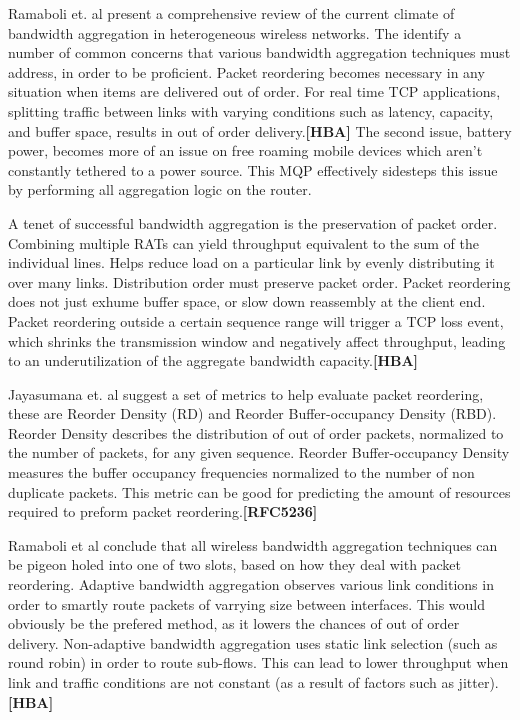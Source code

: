\documentclass[12pt]{article}
\newcommand{\lcite}[1]
{{\bfseries\color{orange}[#1]}}
\begin{document}
	Ramaboli et. al present a comprehensive review of the current climate of bandwidth aggregation in heterogeneous wireless networks. The identify a number of common concerns that various bandwidth aggregation techniques must address, in order to be proficient. Packet reordering becomes necessary in any situation when items are delivered out of order. For real time TCP applications, splitting traffic between links with varying conditions such as latency, capacity, and buffer space, results in out of order delivery.\lcite{HBA} The second issue, battery power, becomes more of an issue on free roaming mobile devices which aren't constantly tethered to a power source. This MQP effectively sidesteps this issue by performing all aggregation logic on the router.

	A tenet of successful bandwidth aggregation is the preservation of packet order. Combining multiple RATs can yield throughput equivalent to the sum of the individual lines. Helps reduce load on a particular link by evenly distributing it over many links. Distribution order must preserve packet order. Packet reordering does not just exhume buffer space, or slow down reassembly at the client end. Packet reordering outside a certain sequence range will trigger a TCP loss event, which shrinks the transmission window and negatively affect throughput, leading to an underutilization of the aggregate bandwidth capacity.\lcite{HBA}

	Jayasumana et. al suggest a set of metrics to help evaluate packet reordering, these are Reorder Density (RD) and Reorder Buffer-occupancy Density (RBD). Reorder Density describes the distribution of out of order packets, normalized to the number of packets, for any given sequence. Reorder Buffer-occupancy Density measures the buffer occupancy frequencies normalized to the number of non duplicate packets. This metric can be good for predicting the amount of resources required to preform packet reordering.\lcite{RFC5236}

	Ramaboli et al conclude that all wireless bandwidth aggregation techniques can be pigeon holed into one of two slots, based on how they deal with packet reordering. Adaptive bandwidth aggregation observes various link conditions in order to smartly route packets of varrying size between interfaces. This would obviously be the prefered method, as it lowers the chances of out of order delivery. Non-adaptive bandwidth aggregation uses static link selection (such as round robin) in order to route sub-flows. This can lead to lower throughput when link and traffic conditions are not constant (as a result of factors such as jitter).\lcite{HBA}
\end{document}
